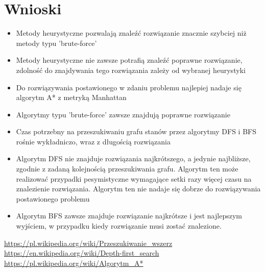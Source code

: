 \documentclass{classrep}
\begin{document}
    \section{Wnioski} {

        \begin{itemize}
            \item Metody heurystyczne pozwalają znaleźć rozwiązanie znacznie szybciej niż
            metody typu 'brute-force'
            \item Metody heurystyczne nie zawsze potrafią znaleźć poprawne rozwiązanie,
            zdolność do znajdywania tego rozwiązania zależy od wybranej heurystyki
            \item Do rozwiązywania postawionego w zdaniu problemu najlepiej nadaje się
            algorytm A* z metryką Manhattan
            \item Algorytmy typu 'brute-force' zawsze znajdują poprawne rozwiązanie
            \item Czas potrzebny na przeszukiwaniu grafu stanów przez algorytmy DFS i BFS
            rośnie wykładniczo, wraz z długością rozwiązania
            \item Algorytm DFS nie znajduje rozwiązania najkrótszego, a jedynie najbliższe,
            zgodnie z zadaną kolejnością przeszukiwania grafu. Algorytm ten może
            realizować przypadki pesymistyczne wymagające setki razy więcej czasu na
            znalezienie rozwiązania. Algorytm ten nie nadaje się dobrze do rozwiązywania
            postawionego problemu
            \item Algorytm BFS zawsze znajduje rozwiązanie najkrótsze i jest najlepszym wyjściem,
            w przypadku kiedy rozwiązanie musi zostać znalezione.
        \end{itemize}
    }
    \begin{thebibliography}{0}
        \url{https://pl.wikipedia.org/wiki/Przeszukiwanie_wszerz}
        \url{https://en.wikipedia.org/wiki/Depth-first_search}
        \url{https://pl.wikipedia.org/wiki/Algorytm_A*}
    \end{thebibliography}
\end{document}
